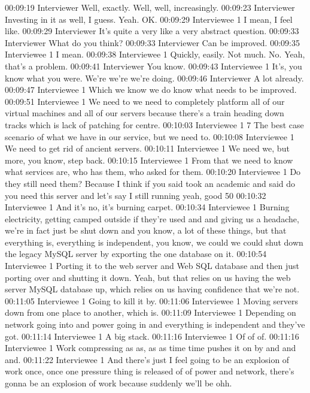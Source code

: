 00:09:19 Interviewer
Well, exactly. Well, well, increasingly.
00:09:23 Interviewer
Investing in it as well, I guess. Yeah. OK.
00:09:29 Interviewee 1
I mean, I feel like.
00:09:29 Interviewer
It's quite a very like a very abstract question.
00:09:33 Interviewer
What do you think?
00:09:33 Interviewer
Can be improved.
00:09:35 Interviewee 1
I mean.
00:09:38 Interviewee 1
Quickly, easily. Not much. No. Yeah, that's a problem.
00:09:41 Interviewer
You know.
00:09:43 Interviewee 1
It's, you know what you were. We're we're we're doing.
00:09:46 Interviewer
A lot already.
00:09:47 Interviewee 1
Which we know we do know what needs to be improved.
00:09:51 Interviewee 1
We need to we need to completely platform all of our virtual machines and all of our servers because there's a train heading down tracks which is lack of patching for centre.
00:10:03 Interviewee 1
7 The best case scenario of what we have in our service, but we need to.
00:10:08 Interviewee 1
We need to get rid of ancient servers.
00:10:11 Interviewee 1
We need we, but more, you know, step back.
00:10:15 Interviewee 1
From that we need to know what services are, who has them, who asked for them.
00:10:20 Interviewee 1
Do they still need them? Because I think if you said took an academic and said do you need this server and let's say I still running yeah, good 50%
00:10:32 Interviewee 1
And it's no, it's burning carpet.
00:10:34 Interviewee 1
Burning electricity, getting camped outside if they're used and and giving us a headache, we're in fact just be shut down and you know, a lot of these things, but that everything is, everything is independent, you know, we could we could shut down the legacy MySQL server by exporting the one database on it.
00:10:54 Interviewee 1
Porting it to the web server and Web SQL database and then just porting over and shutting it down. Yeah, but that relies on us having the web server MySQL database up, which relies on us having confidence that we're not.
00:11:05 Interviewee 1
Going to kill it by.
00:11:06 Interviewee 1
Moving servers down from one place to another, which is.
00:11:09 Interviewee 1
Depending on network going into and power going in and everything is independent and they've got.
00:11:14 Interviewee 1
A big stack.
00:11:16 Interviewee 1
Of of of.
00:11:16 Interviewee 1
Work compressing as as, as as time time pushes it on by and and and.
00:11:22 Interviewee 1
And there's just I feel going to be an explosion of work once, once one pressure thing is released of of power and network, there's gonna be an explosion of work because suddenly we'll be ohh.
